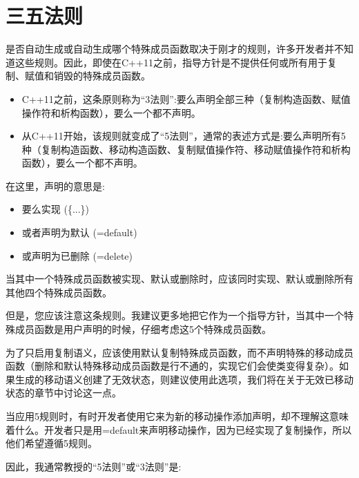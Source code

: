 \section{三五法则}
是否自动生成或自动生成哪个特殊成员函数取决于刚才的规则，许多开发者并不知道这些规则。因此，即使在C++11之前，指导方针是不提供任何或所有用于复制、赋值和销毁的特殊成员函数。

\begin{itemize}
	\item C++11之前，这条原则称为“3法则”:要么声明全部三种（复制构造函数、赋值操作符和析构函数），要么一个都不声明。
	\item 从C++11开始，该规则就变成了“5法则”，通常的表述方式是:要么声明所有5种（复制构造函数、移动构造函数、复制赋值操作符、移动赋值操作符和析构函数），要么一个都不声明。
\end{itemize}

在这里，声明的意思是:

\begin{itemize}
	\item 要么实现 (\{...\})
	\item 或者声明为默认 (=default)
	\item 或声明为已删除 (=delete)
\end{itemize}

当其中一个特殊成员函数被实现、默认或删除时，应该同时实现、默认或删除所有其他四个特殊成员函数。

但是，您应该注意这条规则。我建议更多地把它作为一个指导方针，当其中一个特殊成员函数是用户声明的时候，仔细考虑这5个特殊成员函数。

为了只启用复制语义，应该使用默认复制特殊成员函数，而不声明特殊的移动成员函数（删除和默认特殊移动成员函数是行不通的，实现它们会使类变得复杂）。如果生成的移动语义创建了无效状态，则建议使用此选项，我们将在关于无效已移动状态的章节中讨论这一点。

当应用5规则时，有时开发者使用它来为新的移动操作添加声明，却不理解这意味着什么。开发者只是用=default来声明移动操作，因为已经实现了复制操作，所以他们希望遵循5规则。

因此，我通常教授的“5法则”或“3法则”是:

